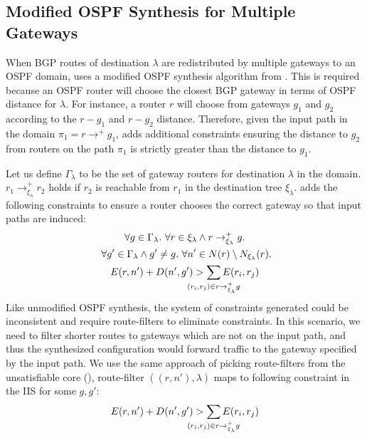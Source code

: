 \subsection{Modified OSPF Synthesis for Multiple Gateways}
When BGP routes of destination $\lambda$ 
are redistributed by multiple gateways to an 
OSPF domain, \name uses a modified OSPF synthesis
algorithm from . This is 
required because an OSPF router will choose
the closest BGP gateway in terms of OSPF distance 
for $\lambda$. For instance, a router $r$ will choose
from gateways $g_1$ and $g_2$ according to the $r-g_1$
and $r-g_2$ distance. Therefore, given the input path in
the domain $\pi_1=r \rightarrow^+ g_1$, \name adds additional
constraints ensuring the distance to $g_2$ from routers
on the path $\pi_1$ is strictly
greater than the distance to $g_1$. 

Let us define $\Gamma_\lambda$ to be the set of gateway
routers for destination $\lambda$ in the domain. 
$r_1 \rightarrow^+_{\xi_{\lambda}} r_2$ holds if
$r_2$ is reachable from $r_1$ in the destination tree $\xi_\lambda$.
\name adds the following constraints 
to ensure a router
chooses the correct gateway so that input 
paths are induced: 
\begin{multline} \label{eq:gateway}
\forall g \in \Gamma_{\lambda}.~\forall r \in \xi_\lambda 
\wedge r \rightarrow^+_{\xi_{\lambda}} g. \\
~\forall g' \in \Gamma_{\lambda} \wedge g' \not= g. 
~\forall n' \in N(r) \setminus N_{\xi_\lambda}(r). \\
E(r, n') + D(n', g') > \sum_{\mathclap{\substack{(r_i,r_j) \in r \rightarrow^+_{\xi_{\lambda}} g }}} 
E(r_i, r_j) 
\end{multline}
Like unmodified OSPF synthesis, the system of
constraints generated could be inconsistent and require
route-filters to eliminate constraints. In this scenario,
we need to filter shorter routes to gateways which are
not on the input path, and 
thus the synthesized configuration would forward traffic to
the gateway specified by the input path. 
We use the same 
approach of picking route-filters from the unsatisfiable core
(), route-filter $((r, n'), \lambda)$
maps to following constraint in the IIS for some $g,g'$: 
\begin{equation}
E(r, n') + D(n', g') > \sum_{\mathclap{\substack{(r_i,r_j) \in r \rightarrow^+_{\xi_{\lambda}} g }}} 
E(r_i, r_j) 
\end{equation}